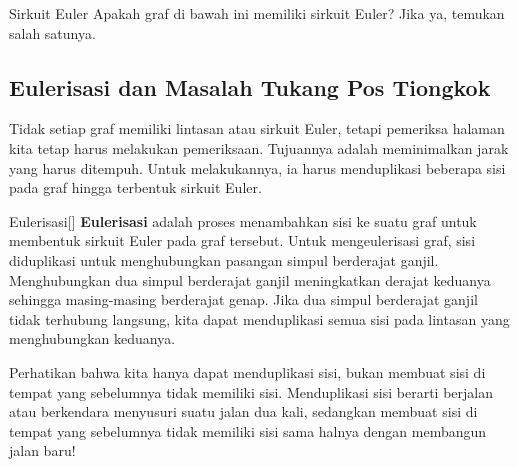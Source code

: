 \begin{ex}{Sirkuit Euler}{}
Apakah graf di bawah ini memiliki sirkuit Euler?  Jika ya, temukan salah satunya.\\

\end{ex}

\subsection{Eulerisasi dan Masalah Tukang Pos Tiongkok}
Tidak setiap graf memiliki lintasan atau sirkuit Euler, tetapi pemeriksa halaman kita tetap harus melakukan pemeriksaan.  Tujuannya adalah meminimalkan jarak yang harus ditempuh.  Untuk melakukannya, ia harus menduplikasi beberapa sisi pada graf hingga terbentuk sirkuit Euler. 

\begin{definition}{Eulerisasi}[]
\textbf{Eulerisasi} adalah proses menambahkan sisi ke suatu graf untuk membentuk sirkuit Euler pada graf tersebut.  Untuk mengeulerisasi graf, sisi diduplikasi untuk menghubungkan pasangan simpul berderajat ganjil.  Menghubungkan dua simpul berderajat ganjil meningkatkan derajat keduanya sehingga masing-masing berderajat genap.  Jika dua simpul berderajat ganjil tidak terhubung langsung, kita dapat menduplikasi semua sisi pada lintasan yang menghubungkan keduanya.
\end{definition}

Perhatikan bahwa kita hanya dapat menduplikasi sisi, bukan membuat sisi di tempat yang sebelumnya tidak memiliki sisi.  Menduplikasi sisi berarti berjalan atau berkendara menyusuri suatu jalan dua kali, sedangkan membuat sisi di tempat yang sebelumnya tidak memiliki sisi sama halnya dengan membangun jalan baru!

